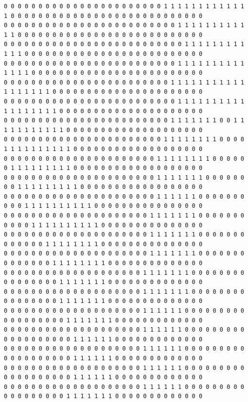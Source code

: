 \documentclass{oci}
\begin{document}
\begin{sampleDescription}
{\begin{verbatim}
0 0 0 0 0 0 0 0 0 0 0 0 0 0 0 0 0 0 0 0 0 0 0 1 1 1 1 1 1 1 1 1 1 1 1 1 0 0 0 0 0 0 0 0 0 0 0 0 0 0 0 0 0 0 0 0 0 0 0 0 0 0 0 0
0 0 0 0 0 0 0 0 0 0 0 0 0 0 0 0 0 0 0 0 0 0 0 0 0 1 1 1 1 1 1 1 1 1 1 1 1 0 0 0 0 0 0 0 0 0 0 0 0 0 0 0 0 0 0 0 0 0 0 0 0 0 0 0
0 0 0 0 0 0 0 0 0 0 0 0 0 0 0 0 0 0 0 0 0 0 0 0 0 0 1 1 1 1 1 1 1 1 1 1 1 1 0 0 0 0 0 0 0 0 0 0 0 0 0 0 0 0 0 0 0 0 0 0 0 0 0 0
0 0 0 0 0 0 0 0 0 0 0 0 0 0 0 0 0 0 0 0 0 0 0 0 0 1 1 1 1 1 1 1 1 1 1 1 1 1 1 0 0 0 0 0 0 0 0 0 0 0 0 0 0 0 0 0 0 0 0 0 0 0 0 0
0 0 0 0 0 0 0 0 0 0 0 0 0 0 0 0 0 0 0 0 0 0 0 0 1 1 1 1 1 1 1 1 1 1 1 1 1 1 1 1 1 1 0 0 0 0 0 0 0 0 0 0 0 0 0 0 0 0 0 0 0 0 0 0
0 0 0 0 0 0 0 0 0 0 0 0 0 0 0 0 0 0 0 0 0 0 0 0 0 1 1 1 1 1 1 1 1 1 1 1 1 1 1 1 1 1 1 0 0 0 0 0 0 0 0 0 0 0 0 0 0 0 0 0 0 0 0 0
0 0 0 0 0 0 0 0 0 0 0 0 0 0 0 0 0 0 0 0 0 0 0 0 1 1 1 1 1 1 1 0 0 1 1 1 1 1 1 1 1 1 1 1 0 0 0 0 0 0 0 0 0 0 0 0 0 0 0 0 0 0 0 0
0 0 0 0 0 0 0 0 0 0 0 0 0 0 0 0 0 0 0 0 0 0 0 1 1 1 1 1 1 1 1 0 0 0 0 1 1 1 1 1 1 1 1 1 1 0 0 0 0 0 0 0 0 0 0 0 0 0 0 0 0 0 0 0
0 0 0 0 0 0 0 0 0 0 0 0 0 0 0 0 0 0 0 0 0 0 1 1 1 1 1 1 1 1 0 0 0 0 0 0 1 1 1 1 1 1 1 1 1 0 0 0 0 0 0 0 0 0 0 0 0 0 0 0 0 0 0 0
0 0 0 0 0 0 0 0 0 0 0 0 0 0 0 0 0 0 0 0 0 0 1 1 1 1 1 1 1 0 0 0 0 0 0 0 0 1 1 1 1 1 1 1 1 1 0 0 0 0 0 0 0 0 0 0 0 0 0 0 0 0 0 0
0 0 0 0 0 0 0 0 0 0 0 0 0 0 0 0 0 0 0 0 0 0 1 1 1 1 1 1 0 0 0 0 0 0 0 0 0 0 1 1 1 1 1 1 1 1 1 1 0 0 0 0 0 0 0 0 0 0 0 0 0 0 0 0
0 0 0 0 0 0 0 0 0 0 0 0 0 0 0 0 0 0 0 0 0 1 1 1 1 1 1 1 0 0 0 0 0 0 0 0 0 0 0 1 1 1 1 1 1 1 1 1 1 0 0 0 0 0 0 0 0 0 0 0 0 0 0 0
0 0 0 0 0 0 0 0 0 0 0 0 0 0 0 0 0 0 0 0 0 1 1 1 1 1 1 1 0 0 0 0 0 0 0 0 0 0 0 0 0 1 1 1 1 1 1 1 1 0 0 0 0 0 0 0 0 0 0 0 0 0 0 0
0 0 0 0 0 0 0 0 0 0 0 0 0 0 0 0 0 0 0 0 0 1 1 1 1 1 1 1 0 0 0 0 0 0 0 0 0 0 0 0 0 0 1 1 1 1 1 1 1 1 0 0 0 0 0 0 0 0 0 0 0 0 0 0
0 0 0 0 0 0 0 0 0 0 0 0 0 0 0 0 0 0 0 0 1 1 1 1 1 1 1 0 0 0 0 0 0 0 0 0 0 0 0 0 0 0 0 1 1 1 1 1 1 1 0 0 0 0 0 0 0 0 0 0 0 0 0 0
0 0 0 0 0 0 0 0 0 0 0 0 0 0 0 0 0 0 0 0 1 1 1 1 1 1 1 0 0 0 0 0 0 0 0 0 0 0 0 0 0 0 0 1 1 1 1 1 1 1 0 0 0 0 0 0 0 0 0 0 0 0 0 0
0 0 0 0 0 0 0 0 0 0 0 0 0 0 0 0 0 0 0 0 1 1 1 1 1 1 0 0 0 0 0 0 0 0 0 0 0 0 0 0 0 0 0 0 1 1 1 1 1 1 1 0 0 0 0 0 0 0 0 0 0 0 0 0
0 0 0 0 0 0 0 0 0 0 0 0 0 0 0 0 0 0 0 0 1 1 1 1 1 1 0 0 0 0 0 0 0 0 0 0 0 0 0 0 0 0 0 0 0 1 1 1 1 1 1 0 0 0 0 0 0 0 0 0 0 0 0 0
0 0 0 0 0 0 0 0 0 0 0 0 0 0 0 0 0 0 0 0 1 1 1 1 1 1 0 0 0 0 0 0 0 0 0 0 0 0 0 0 0 0 0 0 0 1 1 1 1 1 1 0 0 0 0 0 0 0 0 0 0 0 0 0
0 0 0 0 0 0 0 0 0 0 0 0 0 0 0 0 0 0 0 0 1 1 1 1 1 1 0 0 0 0 0 0 0 0 0 0 0 0 0 0 0 0 0 0 0 1 1 1 1 1 1 0 0 0 0 0 0 0 0 0 0 0 0 0
0 0 0 0 0 0 0 0 0 0 0 0 0 0 0 0 0 0 0 0 1 1 1 1 1 1 0 0 0 0 0 0 0 0 0 0 0 0 0 0 0 0 0 0 1 1 1 1 1 1 1 0 0 0 0 0 0 0 0 0 0 0 0 0

\end{verbatim}}
\end{sampleDescription}
\end{document}
